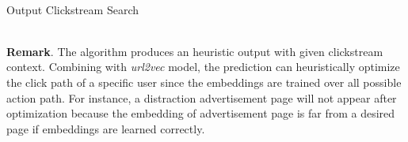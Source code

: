 ~\\

\begin{algorithm}[H]
\label{algo:optimize}
\SetAlgoLined
{}
\caption{Output Clickstream Search}
\end{algorithm}

~\\

\textbf{Remark}. The algorithm produces an heuristic output 
with given clickstream context. Combining with \emph{url2vec} model, the prediction
can heuristically optimize the click path of a specific user since the embeddings are trained 
over all possible action path. For instance, a distraction advertisement page will not appear
after optimization because the embedding of advertisement page is far from a desired page
if embeddings are learned correctly.



\cleardoublepage